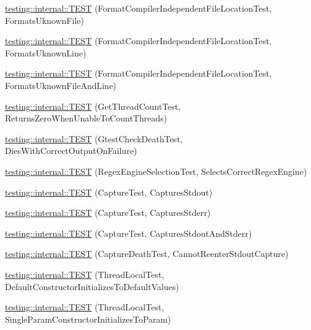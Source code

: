 \begin{DoxyCompactItemize}
\item 
\hyperlink{namespacetesting_1_1internal_a65ad1cad17717c1b8ac4c2d4bef5e079}{testing\-::internal\-::\-T\-E\-S\-T} (Format\-Compiler\-Independent\-File\-Location\-Test, Formats\-Uknown\-File)
\item 
\hyperlink{namespacetesting_1_1internal_a0315a64a661f249628f2884080e0614f}{testing\-::internal\-::\-T\-E\-S\-T} (Format\-Compiler\-Independent\-File\-Location\-Test, Formats\-Uknown\-Line)
\item 
\hyperlink{namespacetesting_1_1internal_a8b9aee556f3dec6e67c35830ba55e0bd}{testing\-::internal\-::\-T\-E\-S\-T} (Format\-Compiler\-Independent\-File\-Location\-Test, Formats\-Uknown\-File\-And\-Line)
\item 
\hyperlink{namespacetesting_1_1internal_a5ad8299ae9325382f01b945f4f81711e}{testing\-::internal\-::\-T\-E\-S\-T} (Get\-Thread\-Count\-Test, Returns\-Zero\-When\-Unable\-To\-Count\-Threads)
\item 
\hyperlink{namespacetesting_1_1internal_afabff70df09a0e4fcda96dd36460c2b9}{testing\-::internal\-::\-T\-E\-S\-T} (Gtest\-Check\-Death\-Test, Dies\-With\-Correct\-Output\-On\-Failure)
\item 
\hyperlink{namespacetesting_1_1internal_a198f7132f76dd44d48dac54dc5d38fbb}{testing\-::internal\-::\-T\-E\-S\-T} (Regex\-Engine\-Selection\-Test, Selects\-Correct\-Regex\-Engine)
\item 
\hyperlink{namespacetesting_1_1internal_a0b658d88cea3a2fe6775b1b269c0204b}{testing\-::internal\-::\-T\-E\-S\-T} (Capture\-Test, Captures\-Stdout)
\item 
\hyperlink{namespacetesting_1_1internal_abbc9510a4f690912c32835213d95198f}{testing\-::internal\-::\-T\-E\-S\-T} (Capture\-Test, Captures\-Stderr)
\item 
\hyperlink{namespacetesting_1_1internal_a341ff65f3ca44b27fc51f03a9a05bee8}{testing\-::internal\-::\-T\-E\-S\-T} (Capture\-Test, Captures\-Stdout\-And\-Stderr)
\item 
\hyperlink{namespacetesting_1_1internal_a325a786fb22b87e5aa8d8f584b42ab09}{testing\-::internal\-::\-T\-E\-S\-T} (Capture\-Death\-Test, Cannot\-Reenter\-Stdout\-Capture)
\item 
\hyperlink{namespacetesting_1_1internal_af366e28e373f36480decc2ea586f48f0}{testing\-::internal\-::\-T\-E\-S\-T} (Thread\-Local\-Test, Default\-Constructor\-Initializes\-To\-Default\-Values)
\item 
\hyperlink{namespacetesting_1_1internal_a5a52dd578217050e621ebd2aace97a70}{testing\-::internal\-::\-T\-E\-S\-T} (Thread\-Local\-Test, Single\-Param\-Constructor\-Initializes\-To\-Param)

\end{DoxyCompactItemize}
